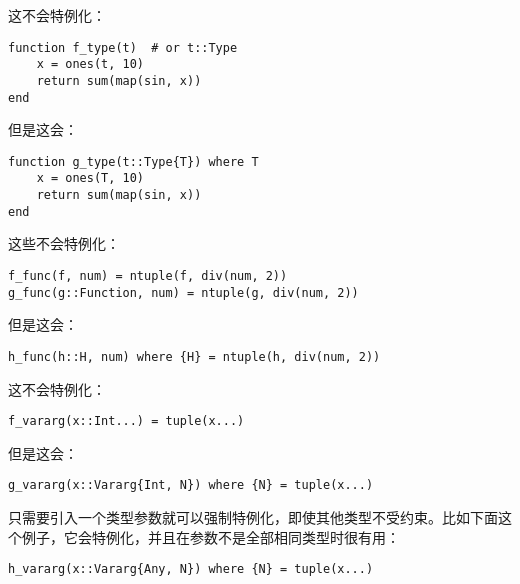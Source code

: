 这不会特例化：




\begin{verbatim}
function f_type(t)  # or t::Type
    x = ones(t, 10)
    return sum(map(sin, x))
end
\end{verbatim}



但是这会：




\begin{verbatim}
function g_type(t::Type{T}) where T
    x = ones(T, 10)
    return sum(map(sin, x))
end
\end{verbatim}



这些不会特例化：




\begin{verbatim}
f_func(f, num) = ntuple(f, div(num, 2))
g_func(g::Function, num) = ntuple(g, div(num, 2))
\end{verbatim}



但是这会：




\begin{verbatim}
h_func(h::H, num) where {H} = ntuple(h, div(num, 2))
\end{verbatim}



这不会特例化：




\begin{verbatim}
f_vararg(x::Int...) = tuple(x...)
\end{verbatim}



但是这会：




\begin{verbatim}
g_vararg(x::Vararg{Int, N}) where {N} = tuple(x...)
\end{verbatim}



只需要引入一个类型参数就可以强制特例化，即使其他类型不受约束。比如下面这个例子，它会特例化，并且在参数不是全部相同类型时很有用：




\begin{verbatim}
h_vararg(x::Vararg{Any, N}) where {N} = tuple(x...)
\end{verbatim}



